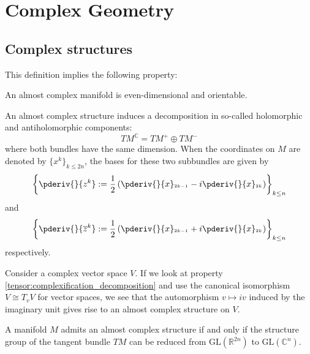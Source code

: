 \chapter{Complex Geometry}\label{chapter:complex_geometry}

\section{Complex structures}


    This definition implies the following property:
    \begin{property}
        An almost complex manifold is even-dimensional and orientable.
    \end{property}

    An almost complex structure induces a decomposition in so-called holomorphic and antiholomorphic components:\[TM^{\mathbb{C}} = TM^+\oplus TM^-\] where both bundles have the same dimension. When the coordinates on $M$ are denoted by $\{x^k\}_{k\leq 2n}$, the bases for these two subbundles are given by \[\left\{\pderiv{}{z^k} := \frac{1}{2}\left(\pderiv{}{x}_{^{2k-1}} - i\pderiv{}{x}_{^{2k}}\right)\right\}_{k\leq n}\] and \[\left\{\pderiv{}{\overline{z}^k} := \frac{1}{2}\left(\pderiv{}{x}_{^{2k-1}} + i\pderiv{}{x}_{^{2k}}\right)\right\}_{k\leq n}\] respectively.


    \begin{example}
        Consider a complex vector space $V$. If we look at property \ref{tensor:complexification_decomposition} and use the canonical isomorphism $V\cong T_vV$ for vector spaces, we see that the automorphism $v\mapsto iv$ induced by the imaginary unit gives rise to an almost complex structure on $V$.
    \end{example}

    \begin{property}
        A manifold $M$ admits an almost complex structure if and only if the structure group of the tangent bundle $TM$ can be reduced from $\text{GL}(\mathbb{R}^{2n})$ to $\text{GL}(\mathbb{C}^n)$.
    \end{property}

